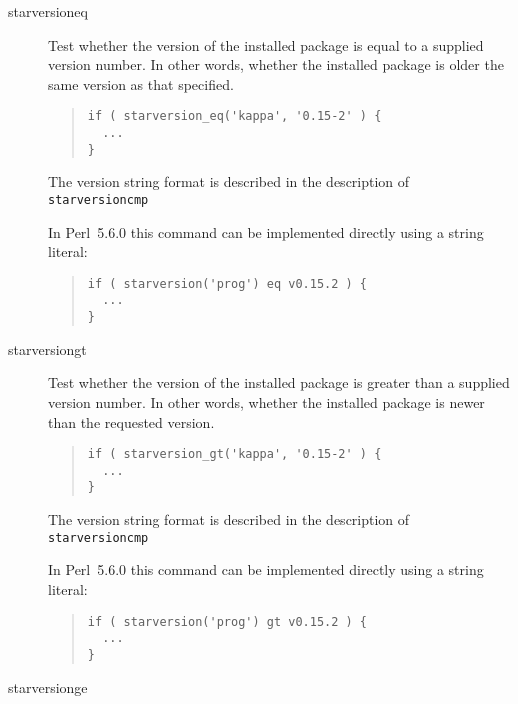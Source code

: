 \documentclass[twoside,11pt]{article}
\newenvironment{myquote}{\begin{quote}\begin{small}}{\end{small}\end{quote}}
\newcommand{\perl}{\xref{\textsf{Perl}}{sun193}{}}
\newcommand{\xref}[3]{#1}
\renewcommand{\_}{\texttt{\symbol{95}}}
\begin{document}
\begin{description}
\item[starversion\_eq] \mbox{}

Test whether the version of the installed package is equal to a supplied
version number. In other words, whether the installed package is older the
same version as that specified.

\begin{myquote}
\begin{verbatim}
if ( starversion_eq('kappa', '0.15-2' ) {
  ...
}
\end{verbatim}
\end{myquote}

The version string format is described in the description of
\texttt{starversion\_cmp}



In \perl\ 5.6.0 this command can be implemented directly using a string literal:

\begin{myquote}
\begin{verbatim}
if ( starversion('prog') eq v0.15.2 ) {
  ...
}
\end{verbatim}
\end{myquote}

\item[starversion\_gt] \mbox{}

Test whether the version of the installed package is greater than 
a supplied version number. In other words, whether the installed
package is newer than the requested version.

\begin{myquote}
\begin{verbatim}
if ( starversion_gt('kappa', '0.15-2' ) {
  ...
}
\end{verbatim}
\end{myquote}

The version string format is described in the description of
\texttt{starversion\_cmp}



In \perl\ 5.6.0 this command can be implemented directly using a 
string literal:

\begin{myquote}
\begin{verbatim}
if ( starversion('prog') gt v0.15.2 ) {
  ...
}
\end{verbatim}
\end{myquote}

\item[starversion\_ge] \mbox{}


\end{description}
\end{document}
